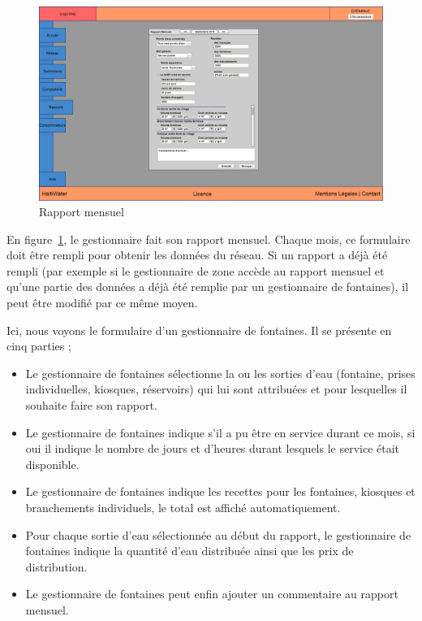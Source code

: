 \documentclass[a4paper, 11pt]{article}
\begin{document}
    \begin{figure}[H]
        \includegraphics[width=\textwidth]{Cahier_des_Charges/rapports_mensuel}
        \caption{Rapport mensuel}
        \label{fig:monthly_report}
    \end{figure}

    En figure~\ref{fig:monthly_report}, le gestionnaire fait son rapport mensuel. Chaque mois, ce formulaire doit être rempli pour obtenir les données du réseau. Si un rapport a déjà été rempli (par exemple si le gestionnaire de zone accède au rapport mensuel et qu'une partie des données a déjà été remplie par un gestionnaire de fontaines), il peut être modifié par ce même moyen.

    Ici, nous voyons le formulaire d'un gestionnaire de fontaines. Il se présente en cinq parties ;
    \begin{itemize}
      \item Le gestionnaire de fontaines sélectionne la ou les sorties d'eau (fontaine, prises individuelles, kiosques, réservoirs) qui lui sont attribuées et pour lesquelles il souhaite faire son rapport.
      \item Le gestionnaire de fontaines indique s'il a pu être en service durant ce mois, si oui il indique le nombre de jours et d'heures durant lesquels le service était disponible.
      \item Le gestionnaire de fontaines indique les recettes pour les fontaines, kiosques et branchements individuels, le total est affiché automatiquement.
      \item Pour chaque sortie d'eau sélectionnée au début du rapport, le gestionnaire de fontaines indique la quantité d'eau distribuée ainsi que les prix de distribution.
      \item Le gestionnaire de fontaines peut enfin ajouter un commentaire au rapport mensuel.
    \end{itemize}
\end{document}
